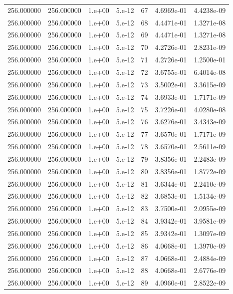 \begin{table}[htbp]
\begin{tabular}{rrrrrrr}
256.000000 & 256.000000 & 1.e+00 & 5.e-12 & 67 & 4.6969e-01 & 4.4238e-09 \\
256.000000 & 256.000000 & 1.e+00 & 5.e-12 & 68 & 4.4471e-01 & 1.3271e-08 \\
256.000000 & 256.000000 & 1.e+00 & 5.e-12 & 69 & 4.4471e-01 & 1.3271e-08 \\
256.000000 & 256.000000 & 1.e+00 & 5.e-12 & 70 & 4.2726e-01 & 2.8231e-09 \\
256.000000 & 256.000000 & 1.e+00 & 5.e-12 & 71 & 4.2726e-01 & 1.2500e-01 \\
256.000000 & 256.000000 & 1.e+00 & 5.e-12 & 72 & 3.6755e-01 & 6.4014e-08 \\
256.000000 & 256.000000 & 1.e+00 & 5.e-12 & 73 & 3.5002e-01 & 3.3615e-09 \\
256.000000 & 256.000000 & 1.e+00 & 5.e-12 & 74 & 3.6933e-01 & 1.7171e-09 \\
256.000000 & 256.000000 & 1.e+00 & 5.e-12 & 75 & 3.7226e-01 & 4.0280e-08 \\
256.000000 & 256.000000 & 1.e+00 & 5.e-12 & 76 & 3.6276e-01 & 3.4343e-09 \\
256.000000 & 256.000000 & 1.e+00 & 5.e-12 & 77 & 3.6570e-01 & 1.7171e-09 \\
256.000000 & 256.000000 & 1.e+00 & 5.e-12 & 78 & 3.6570e-01 & 2.5611e-09 \\
256.000000 & 256.000000 & 1.e+00 & 5.e-12 & 79 & 3.8356e-01 & 2.2483e-09 \\
256.000000 & 256.000000 & 1.e+00 & 5.e-12 & 80 & 3.8356e-01 & 1.8772e-09 \\
256.000000 & 256.000000 & 1.e+00 & 5.e-12 & 81 & 3.6344e-01 & 2.2410e-09 \\
256.000000 & 256.000000 & 1.e+00 & 5.e-12 & 82 & 3.6853e-01 & 1.5134e-09 \\
256.000000 & 256.000000 & 1.e+00 & 5.e-12 & 83 & 3.7500e-01 & 2.0955e-09 \\
256.000000 & 256.000000 & 1.e+00 & 5.e-12 & 84 & 3.9342e-01 & 3.9581e-09 \\
256.000000 & 256.000000 & 1.e+00 & 5.e-12 & 85 & 3.9342e-01 & 1.3097e-09 \\
256.000000 & 256.000000 & 1.e+00 & 5.e-12 & 86 & 4.0668e-01 & 1.3970e-09 \\
256.000000 & 256.000000 & 1.e+00 & 5.e-12 & 87 & 4.0668e-01 & 2.4884e-09 \\
256.000000 & 256.000000 & 1.e+00 & 5.e-12 & 88 & 4.0668e-01 & 2.6776e-09 \\
256.000000 & 256.000000 & 1.e+00 & 5.e-12 & 89 & 4.0960e-01 & 2.8522e-09 \\

\end{tabular}
\end{table}
